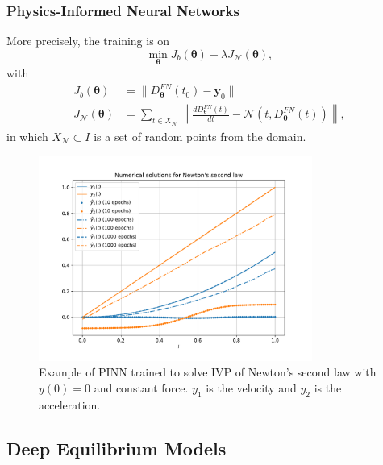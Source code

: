 \documentclass[t]{beamer}
\begin{document}
\begin{frame}
    \frametitle{Physics-Informed Neural Networks}
    More precisely, the training is on \[
	\min_{\bm{\theta}} J_b\left( \bm{\theta} \right) + \lambda J_{\mathcal{N}}\left( \bm{\theta} \right)
    ,\] with
    \begin{align*}
	J_b\left( \bm{\theta} \right) &= \|D^{FN}_{\bm{\theta}}\left( t_0 \right) -\bm{y}_0\| \\
	J_{\mathcal{N}}\left( \bm{\theta} \right) &= \sum_{t \in X_{\mathcal{N}}} \left\| \frac{d D^{FN}_{\bm{\theta}}\left( t \right) }{dt} - \mathcal{N}\left( t,D^{FN}_{\bm{\theta}}\left( t \right)  \right)  \right\|
    ,\end{align*}
    in which $X_{\mathcal{N}}\subset I$ is a set of random points from the domain.
\end{frame}

\begin{frame}
    \begin{figure}[h]
        \centering
        \includegraphics[width=0.8\textwidth]{../images/pinn_newton.pdf}
        \caption{Example of PINN trained to solve IVP of Newton's second law with $y(0)=0$ and constant force. $y_1$ is the velocity and $y_2$ is the acceleration.}
        \label{fig:-images-pinn_newton-pdf}
    \end{figure}
\end{frame}

\subsection{Deep Equilibrium Models}
\end{document}
